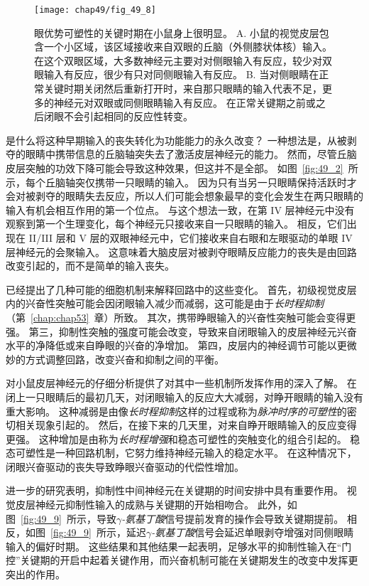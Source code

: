 \begin{figure}[htbp]
	\centering
	\texttt{[image: chap49/fig\_49\_8]}
	\caption{眼优势可塑性的关键时期在小鼠身上很明显\cite{hensch2005critical}。
		A. 小鼠的视觉皮层包含一个小区域，该区域接收来自双眼的丘脑（外侧膝状体核）输入。
		在这个双眼区域，大多数神经元主要对对侧眼输入有反应，较少对双眼输入有反应，很少有只对同侧眼输入有反应。
		B. 当对侧眼睛在正常关键时期关闭然后重新打开时，来自那只眼睛的输入代表不足，更多的神经元对双眼或同侧眼睛输入有反应。
		在正常关键期之前或之后闭眼不会引起相同的反应性转变。}
	\label{fig:49_8}
\end{figure}


是什么将这种早期输入的丧失转化为功能能力的永久改变？
一种想法是，从被剥夺的眼睛中携带信息的丘脑轴突失去了激活皮层神经元的能力。
然而，尽管丘脑皮层突触的功效下降可能会导致这种效果，但这并不是全部。
如图~\ref{fig:49_2}~所示，每个丘脑轴突仅携带一只眼睛的输入。
因为只有当另一只眼睛保持活跃时才会对被剥夺的眼睛失去反应，所以人们可能会想象最早的变化会发生在两只眼睛的输入有机会相互作用的第一个位点。
与这个想法一致，在第 IV 层神经元中没有观察到第一个生理变化，每个神经元只接收来自一只眼睛的输入。
相反，它们出现在 II/III 层和 V 层的双眼神经元中，它们接收来自右眼和左眼驱动的单眼 IV 层神经元的会聚输入。
这意味着大脑皮层对被剥夺眼睛反应能力的丧失是由回路改变引起的，而不是简单的输入丧失。


已经提出了几种可能的细胞机制来解释回路中的这些变化。
首先，初级视觉皮层内的兴奋性突触可能会因闭眼输入减少而减弱，这可能是由于\textit{长时程抑制}（第~\ref{chap:chap53}~章）所致。
其次，携带睁眼输入的兴奋性突触可能会变得更强。
第三，抑制性突触的强度可能会改变，导致来自闭眼输入的皮层神经元兴奋水平的净降低或来自睁眼的兴奋的净增加。
第四，皮层内的神经调节可能以更微妙的方式调整回路，改变兴奋和抑制之间的平衡。


对小鼠皮层神经元的仔细分析提供了对其中一些机制所发挥作用的深入了解。
在闭上一只眼睛后的最初几天，对闭眼输入的反应大大减弱，对睁开眼睛的输入没有重大影响。
这种减弱是由像\textit{长时程抑制}这样的过程或称为\textit{脉冲时序的可塑性}的密切相关现象引起的。
然后，在接下来的几天里，对来自睁开眼睛输入的反应变得更强。
这种增加是由称为\textit{长时程增强}和稳态可塑性的突触变化的组合引起的。
稳态可塑性是一种回路机制，它努力维持神经元输入的稳定水平。
在这种情况下，闭眼兴奋驱动的丧失导致睁眼兴奋驱动的代偿性增加。


进一步的研究表明，抑制性中间神经元在关键期的时间安排中具有重要作用。
视觉皮层神经元抑制性输入的成熟与关键期的开始相吻合。
此外，如图~\ref{fig:49_9}~所示，导致\textit{$\gamma$-氨基丁酸}信号提前发育的操作会导致关键期提前。
相反，如图~\ref{fig:49_9}~所示，延迟\textit{$\gamma$-氨基丁酸}信号会延迟单眼剥夺增强对同侧眼睛输入的偏好时期。
这些结果和其他结果一起表明，足够水平的抑制性输入在“门控”关键期的开启中起着关键作用，而兴奋机制可能在关键期发生的改变中发挥更突出的作用。


